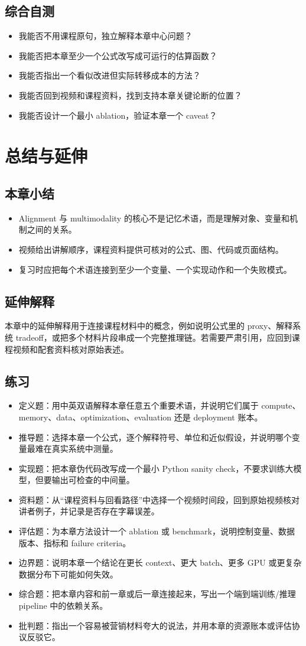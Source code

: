 \documentclass[a4paper]{article}
\begin{document}
\subsection{综合自测}
\begin{itemize}
\item 我能否不用课程原句，独立解释本章中心问题？
\item 我能否把本章至少一个公式改写成可运行的估算函数？
\item 我能否指出一个看似改进但实际转移成本的方法？
\item 我能否回到视频和课程资料，找到支持本章关键论断的位置？
\item 我能否设计一个最小 ablation，验证本章一个 caveat？
\end{itemize}
\section{总结与延伸}
\subsection{本章小结}
\begin{itemize}
\item Alignment 与 multimodality 的核心不是记忆术语，而是理解对象、变量和机制之间的关系。
\item 视频给出讲解顺序，课程资料提供可核对的公式、图、代码或页面结构。
\item 复习时应把每个术语连接到至少一个变量、一个实现动作和一个失败模式。
\end{itemize}
\subsection{延伸解释}
本章中的延伸解释用于连接课程材料中的概念，例如说明公式里的 proxy、解释系统 tradeoff，或把多个材料片段串成一个完整推理链。若需要严肃引用，应回到课程视频和配套资料核对原始表述。
\subsection{练习}
\begin{itemize}
\item 定义题：用中英双语解释本章任意五个重要术语，并说明它们属于 compute、memory、data、optimization、evaluation 还是 deployment 账本。
\item 推导题：选择本章一个公式，逐个解释符号、单位和近似假设，并说明哪个变量最难在真实系统中测量。
\item 实现题：把本章伪代码改写成一个最小 Python sanity check，不要求训练大模型，但要输出可检查的中间量。
\item 资料题：从“课程资料与回看路径”中选择一个视频时间段，回到原始视频核对讲者例子，并记录是否存在字幕误差。
\item 评估题：为本章方法设计一个 ablation 或 benchmark，说明控制变量、数据版本、指标和 failure criteria。
\item 边界题：说明本章一个结论在更长 context、更大 batch、更多 GPU 或更复杂数据分布下可能如何失效。
\item 综合题：把本章内容和前一章或后一章连接起来，写出一个端到端训练/推理 pipeline 中的依赖关系。
\item 批判题：指出一个容易被营销材料夸大的说法，并用本章的资源账本或评估协议反驳它。
\end{itemize}
\end{document}
